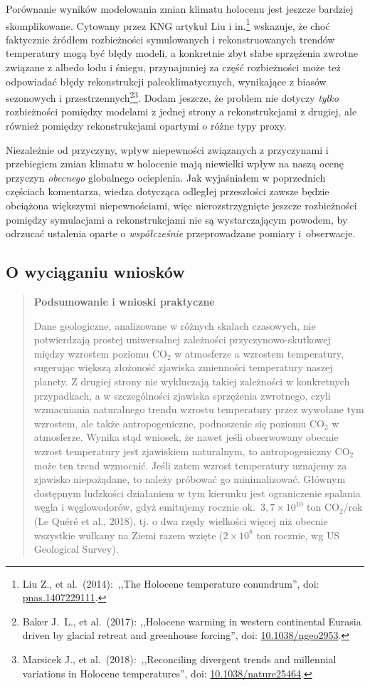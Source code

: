 \documentclass[12pt]{article}
\newcommand{\doi}[1]{doi: \href{htts://doi.org/#1}{#1}}
\begin{document}
Porównanie wyników modelowania zmian klimatu holocenu jest jeszcze bardziej skomplikowane. Cytowany przez KNG artykuł Liu i in.\footnote{Liu Z., et al.~(2014):~,,The Holocene temperature conundrum'', \doi{pnas.1407229111}.} wskazuje, że choć faktycznie źródłem rozbieżności symulowanych i rekonstruowanych trendów temperatury mogą być błędy modeli, a konkretnie zbyt słabe sprzężenia zwrotne związane z albedo lodu i śniegu, przynajmniej za część rozbieżności może też odpowiadać błędy rekonstrukcji paleoklimatycznych, wynikające z biasów sezonowych i przestrzennych\footnote{Baker J.~L., et al.~(2017): ,,Holocene warming in western continental Eurasia driven by glacial retreat and greenhouse forcing'', \doi{10.1038/ngeo2953}.}\footnote{Marsicek J., et al.~(2018):~,,Reconciling divergent trends and millennial variations in Holocene temperatures'', \doi{10.1038/nature25464}.}. Dodam jeszcze, że problem nie dotyczy \emph{tylko} rozbieżności pomiędzy modelami z jednej strony a rekonstrukcjami z drugiej, ale również pomiędzy rekonstrukcjami opartymi o różne typy proxy.
			
Niezależnie od przyczyny, wpływ niepewności związanych z przyczynami i przebiegiem zmian klimatu w holocenie mają niewielki wpływ na naszą ocenę przyczyn \emph{obecnego} globalnego ocieplenia. Jak wyjaśniałem w poprzednich częściach komentarza, wiedza dotycząca odległej przeszłości zawsze będzie obciążona większymi niepewnościami, więc nierozstrzygnięte jeszcze rozbieżności pomiędzy symulacjami a rekonstrukcjami nie są wystarczającym powodem, by odrzucać ustalenia oparte o \emph{współcześnie} przeprowadzane pomiary i~obserwacje.

\newpage

\subsection*{O wyciąganiu wniosków}
			
\begin{quotation}
	\textbf{Podsumowanie i wnioski praktyczne}	

	Dane geologiczne, analizowane w różnych skalach czasowych, nie potwierdzają prostej uniwersalnej zależności przyczynowo-skutkowej między wzrostem poziomu CO$_2$ w atmosferze a wzrostem temperatury, sugerując większą złożoność zjawiska zmienności temperatury naszej planety. Z drugiej strony nie wykluczają takiej zależności w konkretnych przypadkach, a w szczególności zjawiska sprzężenia zwrotnego, czyli wzmacniania naturalnego trendu wzrostu temperatury przez wywołane tym wzrostem, ale także antropogeniczne, podnoszenie się poziomu CO$_2$ w atmosferze. Wynika stąd wniosek, że nawet jeśli obserwowany obecnie wzrost temperatury jest zjawiskiem naturalnym, to antropogeniczny CO$_2$ może ten trend wzmocnić. Jeśli zatem wzrost temperatury uznajemy za zjawisko niepożądane, to należy próbować go minimalizować. Głównym dostępnym ludzkości działaniem w tym kierunku jest ograniczenie spalania węgla i węglowodorów, gdyż emitujemy rocznie ok.~$3{,}7\times10^{10}$ ton CO$_2$/rok (Le Quéré et al., 2018), tj. o dwa rzędy wielkości więcej niż obecnie wszystkie wulkany na Ziemi razem wzięte ($2\times10^{8}$ ton rocznie, wg US Geological Survey).
\end{quotation}
\end{document}
